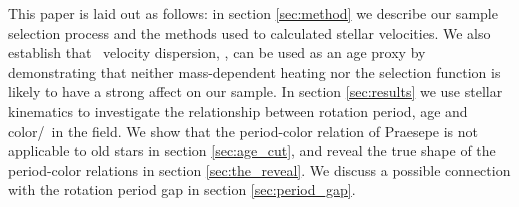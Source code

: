 This paper is laid out as follows: in section \ref{sec:method} we describe our
sample selection process and the methods used to calculated stellar
velocities.
We also establish that \vb\ velocity dispersion, \sigmavb, can be used as an
age proxy by demonstrating that neither mass-dependent heating nor the
selection function is likely to have a strong affect on our sample.
In section \ref{sec:results} we use stellar kinematics to investigate the
relationship between rotation period, age and color/\teff\ in the field.
We show that the period-color relation of Praesepe is not applicable to
old stars in section \ref{sec:age_cut}, and reveal the true shape of the
period-color relations in section \ref{sec:the_reveal}.
We discuss a possible connection with the rotation period gap in section
\ref{sec:period_gap}.

